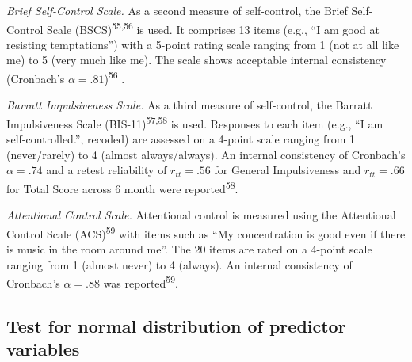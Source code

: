 \documentclass[
  man,floatsintext]{apa6}
\begin{document}
\emph{Brief Self-Control Scale.} As a second measure of self-control, the Brief Self-Control Scale (BSCS)\textsuperscript{55,56} is used.
It comprises 13 items (e.g., ``I am good at resisting temptations'') with a 5-point rating scale ranging from 1 (not at all like me) to 5 (very much like me).
The scale shows acceptable internal consistency (Cronbach's \(\alpha=.81\))\textsuperscript{56} .

\emph{Barratt Impulsiveness Scale.} As a third measure of self-control, the Barratt Impulsiveness Scale (BIS-11)\textsuperscript{57,58} is used.
Responses to each item (e.g., ``I am self-controlled.'', recoded) are assessed on a 4-point scale ranging from 1 (never/rarely) to 4 (almost always/always).
An internal consistency of Cronbach's \(\alpha=.74\) and a retest reliability of \(r_{tt}=.56\) for General Impulsiveness and \(r_{tt}=.66\) for Total Score across 6 month were reported\textsuperscript{58}.

\emph{Attentional Control Scale.} Attentional control is measured using the Attentional Control Scale (ACS)\textsuperscript{59} with items such as ``My concentration is good even if there is music in the room around me''.
The 20 items are rated on a 4-point scale ranging from 1 (almost never) to 4 (always).
An internal consistency of Cronbach's \(\alpha=.88\) was reported\textsuperscript{59}.

\newpage

\hypertarget{SupplementNV}{%
\subsection{Test for normal distribution of predictor variables}\label{SupplementNV}}
\end{document}
